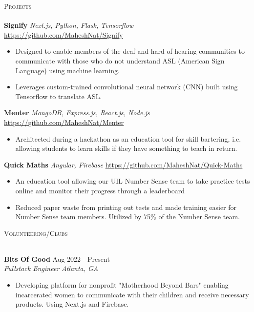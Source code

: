 \documentclass[a4paper]{article}
\newcommand{\lineunder} {
    \vspace*{-8pt} \\
    \hspace*{-18pt} \hrulefill \\
}
\newcommand{\header} [1] {
    {\hspace*{-18pt}\vspace*{6pt} \textsc{#1}}
    \vspace*{-6pt} \lineunder
}
\begin{document}
\header{Projects}
{\textbf{Signify}} {\sl Next.js, Python, Flask, Tensorflow} \hfill \url{https://github.com/MaheshNat/Signify}\\
\begin{itemize} \itemsep -1pt
	\item Designed to enable members of the deaf and hard of hearing communities to communicate with those who do not understand ASL (American Sign Language) using machine learning.
	\item Leverages custom-trained convolutional neural network (CNN) built using Tensorflow to translate ASL.
\end{itemize}
\vspace*{1mm}
{\textbf{Menter}} {\sl MongoDB, Express.js, React.js, Node.js} \hfill \url{https://github.com/MaheshNat/Menter}\\
\begin{itemize} \itemsep -1pt
	\item Architected during a hackathon as an education tool for skill bartering, i.e. allowing students to learn skills if they have something to teach in return.
\end{itemize}
\vspace*{1mm}
{\textbf{Quick Maths}} {\sl Angular, Firebase} \hfill \url{https://github.com/MaheshNat/Quick-Maths} \\
\begin{itemize} \itemsep -1pt
	\item An education tool allowing our UIL Number Sense team to take practice tests online and monitor their progress through a leaderboard
        \item Reduced paper waste from printing out tests and made training easier for Number Sense team members. Utilized by 75\% of the Number Sense team.
\end{itemize}
\vspace*{1mm}

\header{Volunteering/Clubs}
\vspace{1mm}

\textbf{Bits Of Good} \hfill Aug 2022 - Present\\
\textit{Fullstack Engineer} \hfill \textit{Atlanta, GA} \\
\vspace{-1mm}
\begin{itemize} \itemsep -1pt
	\item Developing platform for nonprofit "Motherhood Beyond Bars" enabling incarcerated women to communicate with their children and receive necessary products. Using Next.js and Firebase.
\end{itemize}
\end{document}
